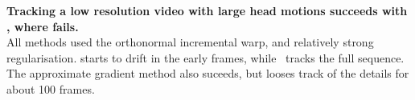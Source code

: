 \documentclass[landscape,a0paper,fontscale=0.292]{baposter}
\begin{document}
\begin{poster}
{  \vspace{1.25em}
  \textbf{Tracking a low resolution video with large head motions
  succeeds with \CoDe{}, where \ICIA{} fails.}\\ All methods used the orthonormal
  incremental warp, and relatively strong regularisation.  \ICIA{} starts to
  drift in the early frames, while~\CoDe{} tracks the full sequence. The
  approximate gradient method \LinCoDe{} also suceeds, but looses
  track of the details for about 100 frames.
   }

\end{poster}%
%
\end{document}
